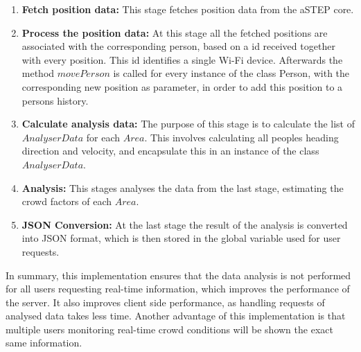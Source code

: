 \begin{enumerate}
    \item \textbf{Fetch position data:} This stage fetches position data from the aSTEP core.
    \item \textbf{Process the position data:} At this stage all the fetched positions are associated with the corresponding person, based on a id received together with every position. This id identifies a single Wi-Fi device. Afterwards the method $movePerson$ is called for every instance of the class Person, with the corresponding new position as parameter, in order to add this position to a persons history.
    \item \textbf{Calculate analysis data:} The purpose of this stage is to calculate the list of $AnalyserData$ for each $Area$. This involves calculating all peoples heading direction and velocity, and encapsulate this in an instance of the class $AnalyserData$.
    \item \textbf{Analysis:} This stages analyses the data from the last stage, estimating the crowd factors of each $Area$.
    \item \textbf{JSON Conversion:} At the last stage the result of the analysis is converted into JSON format, which is then stored in the global variable used for user requests. 
\end{enumerate}

In summary, this implementation ensures that the data analysis is not performed for all users requesting real-time information, which improves the performance of the server. It also improves client side performance, as handling requests of analysed data takes less time. Another advantage of this implementation is that multiple users monitoring real-time crowd conditions will be shown the exact same information.
